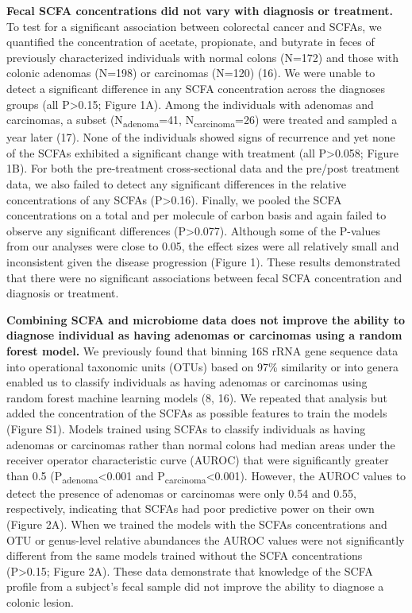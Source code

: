 \documentclass[11pt,]{article}
\begin{document}
\textbf{Fecal SCFA concentrations did not vary with diagnosis or
treatment.} To test for a significant association between colorectal
cancer and SCFAs, we quantified the concentration of acetate,
propionate, and butyrate in feces of previously characterized
individuals with normal colons (N=172) and those with colonic adenomas
(N=198) or carcinomas (N=120) (16). We were unable to detect a
significant difference in any SCFA concentration across the diagnoses
groups (all P\textgreater{}0.15; Figure 1A). Among the individuals with
adenomas and carcinomas, a subset (N\textsubscript{adenoma}=41,
N\textsubscript{carcinoma}=26) were treated and sampled a year later
(17). None of the individuals showed signs of recurrence and yet none of
the SCFAs exhibited a significant change with treatment (all
P\textgreater{}0.058; Figure 1B). For both the pre-treatment
cross-sectional data and the pre/post treatment data, we also failed to
detect any significant differences in the relative concentrations of any
SCFAs (P\textgreater{}0.16). Finally, we pooled the SCFA concentrations
on a total and per molecule of carbon basis and again failed to observe
any significant differences (P\textgreater{}0.077). Although some of the
P-values from our analyses were close to 0.05, the effect sizes were all
relatively small and inconsistent given the disease progression (Figure
1). These results demonstrated that there were no significant
associations between fecal SCFA concentration and diagnosis or
treatment.

\textbf{Combining SCFA and microbiome data does not improve the ability
to diagnose individual as having adenomas or carcinomas using a random
forest model.} We previously found that binning 16S rRNA gene sequence
data into operational taxonomic units (OTUs) based on 97\% similarity or
into genera enabled us to classify individuals as having adenomas or
carcinomas using random forest machine learning models (8, 16). We
repeated that analysis but added the concentration of the SCFAs as
possible features to train the models (Figure S1). Models trained using
SCFAs to classify individuals as having adenomas or carcinomas rather
than normal colons had median areas under the receiver operator
characteristic curve (AUROC) that were significantly greater than 0.5
(P\textsubscript{adenoma}\textless{}0.001 and
P\textsubscript{carcinoma}\textless{}0.001). However, the AUROC values
to detect the presence of adenomas or carcinomas were only 0.54 and
0.55, respectively, indicating that SCFAs had poor predictive power on
their own (Figure 2A). When we trained the models with the SCFAs
concentrations and OTU or genus-level relative abundances the AUROC
values were not significantly different from the same models trained
without the SCFA concentrations (P\textgreater{}0.15; Figure 2A). These
data demonstrate that knowledge of the SCFA profile from a subject's
fecal sample did not improve the ability to diagnose a colonic lesion.
\end{document}
